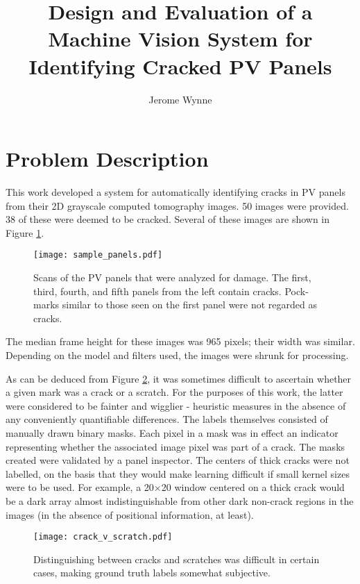 \documentclass[11pt]{article} %
\title{Design and Evaluation of a Machine Vision System for Identifying Cracked PV Panels}
\author{Jerome Wynne}
\begin{document}
\maketitle

\section{Problem Description}

This work developed a system for automatically identifying cracks in PV panels from their 2D grayscale computed tomography images. 50 images were provided. 38 of these were deemed to be cracked. Several of these images are shown in Figure \ref{fig:sample_panels}.
\begin{figure}[h!]
\texttt{[image: sample\_panels.pdf]}
\caption{Scans of the PV panels that were analyzed for damage. The first, third, fourth, and fifth panels from the left contain cracks. Pock-marks similar to those seen on the first panel were not regarded as cracks.}
\label{fig:sample_panels}
\end{figure}

 The median frame height for these images was 965 pixels; their width was similar. Depending on the model and filters used, the images were shrunk for processing.

As can be deduced from Figure \ref{fig:crack_v_scratch}, it was sometimes difficult to ascertain whether a given mark was a crack or a scratch. For the purposes of this work, the latter were considered to be fainter and wigglier - heuristic measures in the absence of any conveniently quantifiable differences. The labels themselves consisted of manually drawn binary masks. Each pixel in a mask was in effect an indicator representing whether the associated image pixel was part of a crack. {\color{red}The masks created were validated by a panel inspector}. The centers of thick cracks were not labelled, on the basis that they would make learning difficult if small kernel sizes were to be used. For example, a 20$\times$20 window centered on a thick crack would be a dark array almost indistinguishable from other dark non-crack regions in the images (in the absence of positional information, at least).

\begin{figure}[h!]
\centering
\texttt{[image: crack\_v\_scratch.pdf]}
\caption{Distinguishing between cracks and scratches was difficult in certain cases, making ground truth labels somewhat subjective.}
\label{fig:crack_v_scratch}
\end{figure}
\end{document}
